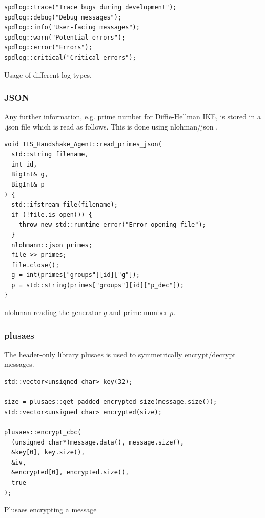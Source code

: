 \documentclass[12pt, letterpaper]{article}
\newenvironment{code}{\captionsetup{type=listing}}{}
\begin{document}
\begin{code}
	\begin{verbatim}
spdlog::trace("Trace bugs during development");
spdlog::debug("Debug messages");
spdlog::info("User-facing messages");
spdlog::warn("Potential errors");
spdlog::error("Errors");
spdlog::critical("Critical errors");
	\end{verbatim}
	\caption{Usage of different log types.}
	\label{spdlog}
\end{code}



\subsubsection{JSON}
Any further information, e.g. prime number for Diffie-Hellman IKE, is stored in a .json file which is read as follows. This is done using nlohman/json \cite{json_ref}.

\begin{code}
	\begin{verbatim}
void TLS_Handshake_Agent::read_primes_json(
  std::string filename, 
  int id, 
  BigInt& g, 
  BigInt& p
) {
  std::ifstream file(filename);
  if (!file.is_open()) {
    throw new std::runtime_error("Error opening file");
  }
  nlohmann::json primes;
  file >> primes;
  file.close();
  g = int(primes["groups"][id]["g"]); 
  p = std::string(primes["groups"][id]["p_dec"]);
}
	\end{verbatim}
	\caption{nlohman reading the generator $g$ and prime number $p$.}
	\label{json}
\end{code}


\subsubsection{plusaes}
The header-only library plusaes \cite{plusaes} is used to symmetrically encrypt/decrypt messages.

\begin{code}
	\begin{verbatim}
std::vector<unsigned char> key(32);
	
size = plusaes::get_padded_encrypted_size(message.size());
std::vector<unsigned char> encrypted(size);
	
plusaes::encrypt_cbc(
  (unsigned char*)message.data(), message.size(), 
  &key[0], key.size(), 
  &iv, 
  &encrypted[0], encrypted.size(), 
  true
);

	\end{verbatim}
	\caption{Plusaes encrypting a message}
	\label{plusaes}
\end{code}
\end{document}
